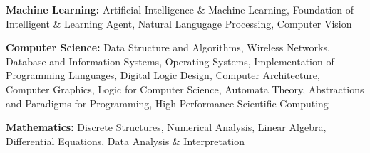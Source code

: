 \begin{cventries}
  \cventry
    {}
    {}
    {}
    {}
    {
    \vspace*{-0.4cm}
      \begin{cvitems}
        \item {\textbf{Machine Learning: }\hspace{0.9mm}Artificial Intelligence \& Machine Learning, Foundation of Intelligent \& Learning Agent, \hspace*{3.2cm}Natural Langugage Processing, Computer Vision}
        \vspace{0.5mm}
        \item {\textbf{Computer Science: }\hspace{0.7mm}Data Structure and Algorithms, Wireless Networks, Database and Information Systems, \hspace*{3.2cm}Operating Systems, Implementation of Programming Languages, Digital Logic Design, \hspace*{3.2cm}Computer Architecture, Computer Graphics, Logic for Computer Science, Automata Theory, \hspace*{3.2cm}Abstractions and Paradigms for Programming, High Performance Scientific Computing}
        \vspace{0.5mm}
        \item{\textbf{Mathematics: }\hspace{8.5mm}Discrete Structures, Numerical Analysis, Linear Algebra, Differential Equations, \hspace*{3.2cm}Data Analysis \& Interpretation\newline}
      \end{cvitems} 
    }
    
\end{cventries}
\vspace{-0.8mm}
